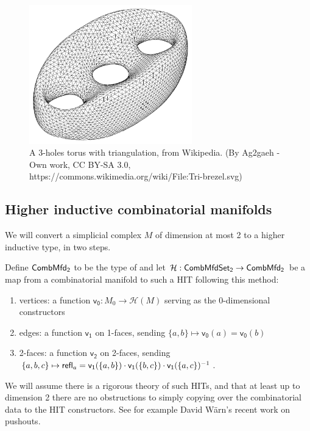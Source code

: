 \begin{figure}[htbp]
\centering
\includegraphics[width=200pt]{triangulated_genus3.pdf}
\caption{A 3-holes torus with triangulation, from Wikipedia. (By Ag2gaeh - Own work, CC BY-SA 3.0, https://commons.wikimedia.org/wiki/File:Tri-brezel.svg)}
\label{fig:genus3_wiki_triangulation}
\end{figure}

\subsection{Higher inductive combinatorial manifolds}

We will convert a simplicial complex \( M \) of dimension at most 2 to a higher inductive type, in two steps. 

\begin{mydef}
Define \( \mathsf{CombMfd_2} \) to be the type of  and let \( \mathcal{H}:\mathsf{CombMfdSet_2}\to\mathsf{CombMfd_2} \) be a map from a combinatorial manifold to such a HIT following this method:
\begin{enumerate}
\item vertices: a function \( \mathsf{v_0}:M_0\to \mathcal{H}(M) \) serving as the 0-dimensional constructors
\item edges: a function \( \mathsf{v_1} \) on 1-faces, sending \( \{a, b\}\mapsto \mathsf{v_0}(a)=\mathsf{v_0}(b) \)
\item 2-faces: a function \( \mathsf{v_2} \) on 2-faces, sending \( \{a, b, c\}\mapsto \mathsf{refl}_a = \mathsf{v_1}(\{a, b\})\cdot \mathsf{v_1}(\{b, c\})\cdot \mathsf{v_1}(\{a, c\})^{-1} \).
\end{enumerate}
\end{mydef}

We will assume there is a rigorous theory of such HITs, and that at least up to dimension 2 there are no obstructions to simply copying over the combinatorial data to the HIT constructors. See for example David Wärn's recent work on pushouts\cite{warn_pushouts}.

